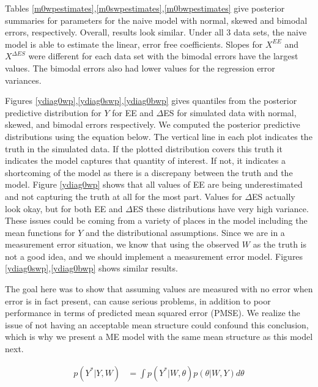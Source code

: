 \documentclass[11pt]{article}\usepackage[]{graphicx}\usepackage[]{color}
\begin{document}
Tables \ref{m0wpestimates},\ref{m0swpestimates},\ref{m0bwpestimates} give posterior summaries for parameters for the naive model with normal, skewed and bimodal errors, respectively. Overall, results look similar. Under all 3 data sets, the naive model is able to estimate the linear, error free coefficients. Slopes for $X^{EE}$ and $X^{\Delta ES}$ were different for each data set with the bimodal errors have the largest values. The bimodal errors also had lower values for the regression error variances.


Figures \ref{ydiag0wp},\ref{ydiag0swp},\ref{ydiag0bwp} gives quantiles from the posterior predictive distribution for $Y$ for EE and $\Delta$ES for simulated data with normal, skewed, and bimodal errors respectively. We computed the posterior predictive distributions using the equation below. The vertical line in each plot indicates the truth in the simulated data. If the plotted distribution covers this truth it indicates the model captures that quantity of interest. If not, it indicates a shortcoming of the model as there is a discrepany between the truth and the model. Figure \ref{ydiag0wp} shows that all values of EE are being underestimated and not capturing the truth at all for the most part. Values for $\Delta$ES actually look okay, but for both EE and $\Delta$ES these distributions have very high variance. These issues could be coming from a variety of places in the model including the mean functions for $Y$ and the distributional assumptions. Since we are in a measurement error situation, we know that using the observed $W$ as the truth is not a good idea, and we should implement a measurement error model. Figures \ref{ydiag0swp},\ref{ydiag0bwp} shows similar results. 

The goal here was to show that assuming values are measured with no error when error is in fact present, can cause serious problems, in addition to poor performance in terms of predicted mean squared error (PMSE). We realize the issue of not having an acceptable mean structure could confound this conclusion, which is why we present a ME model with the same mean structure as this model next.

 \begin{align}
   \label{ypostpred0}
   p(Y^*|Y,W) &= \int p(Y^*|W,\theta) p(\theta|W,Y) d\theta
 \end{align}
\end{document}
